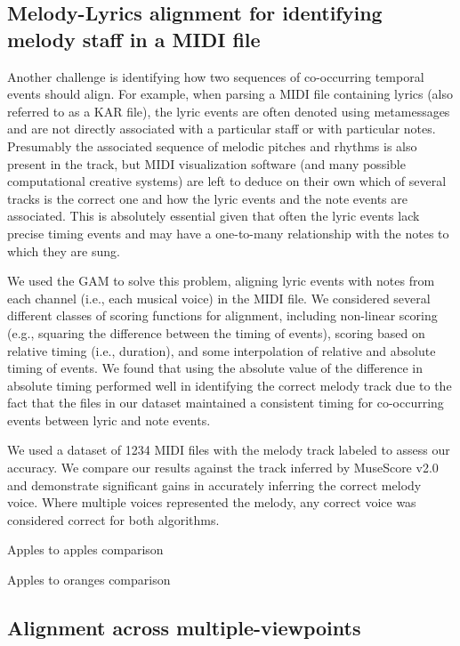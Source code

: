 \documentclass[letterpaper]{article}
\begin{document}
\subsection{Melody-Lyrics alignment for identifying melody staff in a MIDI file}

Another challenge is identifying how two sequences of co-occurring temporal events should align. For example, when parsing a MIDI file containing lyrics (also referred to as a KAR file), the lyric events are often denoted using metamessages and are not directly associated with a particular staff or with particular notes. Presumably the associated sequence of melodic pitches and rhythms is also present in the track, but MIDI visualization software (and many possible computational creative systems) are left to deduce on their own which of several tracks is the correct one and how the lyric events and the note events are associated. This is absolutely essential given that often the lyric events lack precise timing events and may have a one-to-many relationship with the notes to which they are sung.

We used the GAM to solve this problem, aligning lyric events with notes from each channel (i.e., each musical voice) in the MIDI file. We considered several different classes of scoring functions for alignment, including non-linear scoring (e.g., squaring the difference between the timing of events), scoring based on relative timing (i.e., duration), and some interpolation of relative and absolute timing of events. We found that using the absolute value of the difference in absolute timing performed well in identifying the correct melody track due to the fact that the files in our dataset maintained a consistent timing for co-occurring events between lyric and note events.

We used a dataset of 1234 MIDI files with the melody track labeled to assess our accuracy. We compare our results against the track inferred by MuseScore v2.0 and demonstrate significant gains in accurately inferring the correct melody voice. Where multiple voices represented the melody, any correct voice was considered correct for both algorithms.

Apples to apples comparison

Apples to oranges comparison

\subsection{Alignment across multiple-viewpoints}
\end{document}

